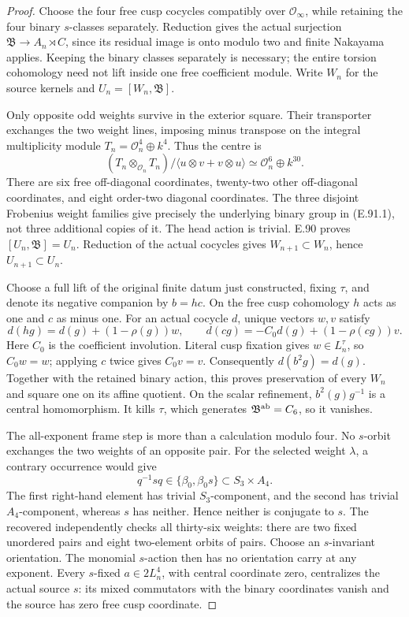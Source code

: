 \begin{proof}
Choose the four free cusp cocycles compatibly over
\(\mathcal O_\infty\), while retaining the four binary
\(s\)-classes separately.  Reduction gives the actual
surjection \(\mathfrak B\to A_n\rtimes C\), since its residual
image is onto modulo two and finite Nakayama applies.
Keeping the binary classes separately is necessary;
the entire torsion cohomology need not lift inside one
free coefficient module.
Write \(W_n\) for the source kernels and
\(U_n=[W_n,\mathfrak B]\).

Only opposite odd weights survive in the exterior square.
Their transporter exchanges the two weight lines, imposing
minus transpose on the integral multiplicity module
\(T_n=\mathcal O_n^4\oplus k^4\).  Thus the centre is
\[
 (T_n\otimes_{\mathcal O_n}T_n)/
       \langle u\otimes v+v\otimes u\rangle
       \simeq\mathcal O_n^6\oplus k^{30}.                \tag{E.91.4}
\]
There are six free off-diagonal coordinates, twenty-two other
off-diagonal coordinates, and eight order-two diagonal coordinates.
The three disjoint Frobenius weight families give precisely
the underlying binary group in (E.91.1), not three additional
copies of it.  The head action is trivial.  E.90 proves
\([U_n,\mathfrak B]=U_n\).  Reduction of the actual cocycles
gives \(W_{n+1}\subset W_n\), hence \(U_{n+1}\subset U_n\).

Choose a full lift of the original finite datum just constructed,
fixing \(\tau\), and denote its negative companion by \(b=hc\).
On the free cusp cohomology \(h\) acts as one and \(c\) as minus
one.  For an actual cocycle \(d\), unique vectors \(w,v\) satisfy
\[
 d(hg)=d(g)+(1-\rho(g))w,\qquad
 d(cg)=-C_0d(g)+(1-\rho(cg))v.                            \tag{E.91.5}
\]
Here \(C_0\) is the coefficient involution.
Literal cusp fixation gives \(w\in L_n^\tau\), so \(C_0w=w\);
applying \(c\) twice gives \(C_0v=v\).
Consequently \(d(b^2g)=d(g)\).
Together with the retained binary action, this proves preservation
of every \(W_n\) and square one on its affine quotient.
On the scalar refinement, \(b^2(g)g^{-1}\) is a central
homomorphism.  It kills \(\tau\), which generates
\(\mathfrak B^{\rm ab}=C_6\), so it vanishes.

The all-exponent frame step is more than a calculation modulo four.
No \(s\)-orbit exchanges the two weights of an opposite pair.
For the selected weight \(\lambda\), a contrary occurrence would give
\[
 q^{-1}sq\in\{\beta_0,\beta_0s\}\subset S_3\times A_4.
                                                        \tag{E.91.6}
\]
The first right-hand element has trivial \(S_3\)-component,
and the second has trivial \(A_4\)-component, whereas \(s\)
has neither.  Hence neither is conjugate to \(s\).
The recovered  independently
checks all thirty-six weights: there are two fixed unordered
pairs and eight two-element orbits of pairs.
Choose an \(s\)-invariant orientation.  The monomial \(s\)-action
then has no orientation carry at any exponent.
Every \(s\)-fixed \(a\in2L_n^4\), with central coordinate zero,
centralizes the actual source \(s\): its mixed commutators
with the binary coordinates vanish and the source has zero
free cusp coordinate.


\end{proof}
